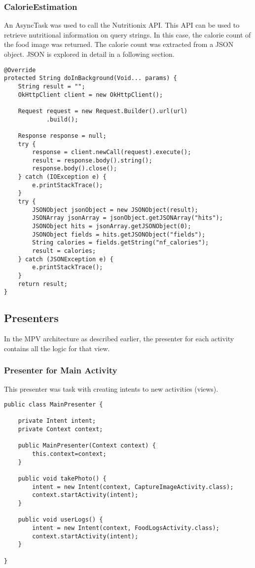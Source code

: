 \subsubsection*{CalorieEstimation}
An AsyncTask was used to call the Nutritionix API.
This API can be used to retrieve nutritional information on query strings.
In this case, the calorie count of the food image was returned.
The calorie count was extracted from a JSON object.
JSON is explored in detail in a following section.
\begin{lstlisting}[style=Java]
@Override
protected String doInBackground(Void... params) {
    String result = "";
    OkHttpClient client = new OkHttpClient();

    Request request = new Request.Builder().url(url)
            .build();

    Response response = null;
    try {
        response = client.newCall(request).execute();
        result = response.body().string();
        response.body().close();
    } catch (IOException e) {
        e.printStackTrace();
    }
    try {
        JSONObject jsonObject = new JSONObject(result);
        JSONArray jsonArray = jsonObject.getJSONArray("hits");
        JSONObject hits = jsonArray.getJSONObject(0);
        JSONObject fields = hits.getJSONObject("fields");
        String calories = fields.getString("nf_calories");
        result = calories;
    } catch (JSONException e) {
        e.printStackTrace();
    }
    return result;
}
\end{lstlisting}

\subsection*{Presenters}
In the MPV architecture as described earlier, the presenter for each activity contains all the logic for that view.

\subsubsection*{Presenter for Main Activity}
This presenter was task with creating intents to new activities (views).
\begin{lstlisting}[style=Java]
public class MainPresenter {

    private Intent intent;
    private Context context;

    public MainPresenter(Context context) {
        this.context=context;
    }

    public void takePhoto() {
        intent = new Intent(context, CaptureImageActivity.class);
        context.startActivity(intent);
    }

    public void userLogs() {
        intent = new Intent(context, FoodLogsActivity.class);
        context.startActivity(intent);
    }

}
\end{lstlisting}

